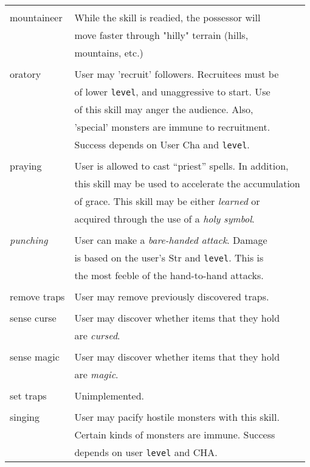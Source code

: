 \begin{longtable}{|p{4cm}|p{9cm}|}
 & \\
mountaineer	& While the skill is readied, the possessor will \\
		& move faster through "hilly" terrain (hills, \\
		& mountains, etc.) \\
 & \\
oratory		& User may 'recruit' followers. Recruitees must be \\
		& of lower {\tt level}, and unaggressive to start. Use \\
		& of this skill may anger the audience. Also, \\
		& 'special' monsters are immune to recruitment. \\
		& Success depends on User Cha and {\tt level}. \\
 & \\
praying		& User is allowed to cast ``priest'' spells. In addition, \\
		& this skill may be used to accelerate the accumulation \\
		& of grace. This skill may be either {\em learned} or \\
		& acquired through the use of a {\em holy symbol}. \\
 & \\
{\em punching}	& User can make a {\em bare-handed attack}. Damage \\
		& is based on the user's Str and {\tt level}. This is \\
		& the most feeble of the hand-to-hand attacks. \\
 & \\
remove traps 	& User may remove previously discovered traps. \\
 & \\
sense curse	& User may discover whether items that they hold \\
		& are {\em cursed}. \\
 & \\
sense magic	& User may discover whether items that they hold \\
		& are {\em magic}. \\
 & \\
set traps	& Unimplemented. \\
 & \\
singing		& User may pacify hostile monsters with this skill. \\
		& Certain kinds of monsters are immune. Success \\
		& depends on user {\tt level} and CHA. \\

\end{longtable}
